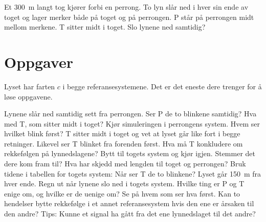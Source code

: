 \documentclass[11pt]{article}
\begin{document}

Et 300~m langt tog kjører forbi en perrong. To lyn slår ned i hver sin ende av toget og lager merker både på toget og på perrongen. P står på perrongen midt mellom merkene. T sitter midt i toget. Slo lynene ned samtidig?

\section*{Oppgaver}

Lyset har farten $c$ i begge referansesystemene. Det er det eneste dere trenger for å løse oppgavene.

\begin{oppgaveliste}
\oppgave {}Lynene slår ned samtidig sett fra perrongen. Ser P de to blinkene samtidig? Hva med T, som sitter midt i toget?
\svar
\oppgave {}Kjør simuleringen i perrongens system. Hvem ser hvilket blink først?
\svar
\oppgave {}T sitter midt i toget og vet at lyset går like fort i begge retninger. Likevel ser T blinket fra forenden først. Hva må T konkludere om rekkefølgen på lynnedslagene?
\svar
\oppgave {}Bytt til togets system og kjør igjen. Stemmer det dere kom fram til? Hva har skjedd med lengden til toget og perrongen?
\svar
\oppgave {}Bruk tidene i tabellen for togets system: Når ser T de to blinkene? Lyset går 150~m fra hver ende. Regn ut når lynene slo ned i togets system.
\svar
\oppgave {}Hvilke ting er P og T enige om, og hvilke er de uenige om? Se på hvem som ser hva først.
\svar
\oppgave {}Kan to hendelser bytte rekkefølge i et annet referansesystem hvis den ene er årsaken til den andre? Tips: Kunne et signal ha gått fra det ene lynnedslaget til det andre?
\svar
\end{oppgaveliste}
\end{document}
